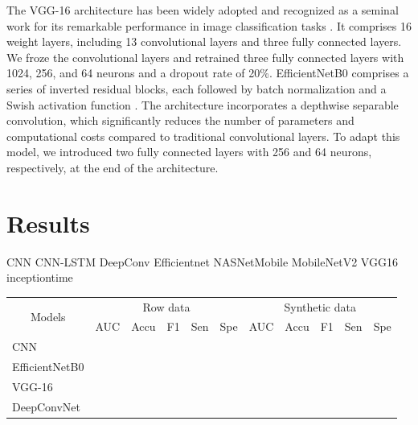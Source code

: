 \documentclass{article}
\begin{document}
\par The VGG-16 architecture has been widely adopted and recognized as a seminal work for its remarkable performance in image classification tasks \cite{simonyan2014very}. It comprises 16 weight layers, including 13 convolutional layers and three fully connected layers. We froze the convolutional layers and retrained three fully connected layers with 1024, 256, and 64 neurons and a dropout rate of 20\%. EfficientNetB0 comprises a series of inverted residual blocks, each followed by batch normalization and a Swish activation function \cite{tan2019efficientnet}. The architecture incorporates a depthwise separable convolution, which significantly reduces the number of parameters and computational costs compared to traditional convolutional layers. To adapt this model, we introduced two fully connected layers with 256 and 64 neurons, respectively, at the end of the architecture.


\section{Results}
CNN
CNN-LSTM
DeepConv
Efficientnet
NASNetMobile
MobileNetV2
VGG16
inceptiontime



\begin{table}[]
\begin{tabular}{|l|l|l|l|l|l|l|l|l|l|l|}
\hline
\multicolumn{1}{|c|}{\multirow{2}{*}{Models}} & \multicolumn{5}{c|}{Row data} & \multicolumn{5}{c|}{Synthetic data} \\ \cline{2-11} 
\multicolumn{1}{|c|}{}                        & AUC  & Accu  & F1 & Sen & Spe & AUC   & Accu   & F1   & Sen  & Spe  \\ \hline
CNN                                           &      &       &    &     &     &       &        &      &      &      \\ \hline
EfficientNetB0                                &      &       &    &     &     &       &        &      &      &      \\ \hline
VGG-16                                        &      &       &    &     &     &       &        &      &      &      \\ \hline
DeepConvNet                                   &      &       &    &     &     &       &        &      &      &      \\ \hline
\end{tabular}
\end{table}
\end{document}
